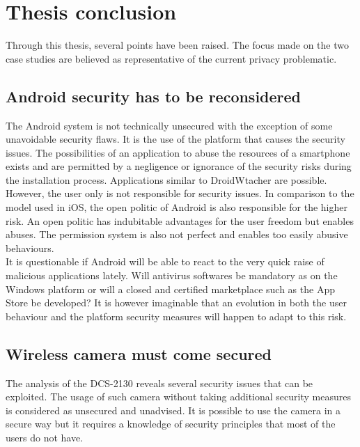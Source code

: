 \chapter{Thesis conclusion}

Through this thesis, several points have been raised.
The focus made on the two case studies are believed as representative of the current privacy problematic.

\section{Android security has to be reconsidered}

The Android system is not technically unsecured with the exception of some unavoidable security flaws.
It is the use of the platform that causes the security issues.
The possibilities of an application to abuse the resources of a smartphone exists and are permitted by a negligence or ignorance of the security risks during the installation process.
Applications similar to DroidWtacher are possible.\\

However, the user only is not responsible for security issues.
In comparison to the model used in iOS, the open politic of Android is also responsible for the higher risk.
An open politic has indubitable advantages for the user freedom but enables abuses.
The permission system is also not perfect and enables too easily abusive behaviours.\\

It is questionable if Android will be able to react to the very quick raise of malicious applications lately.
Will antivirus softwares be mandatory as on the Windows platform or will a closed and certified marketplace such as the App Store be developed?
It is however imaginable that an evolution in both the user behaviour and the platform security measures will happen to adapt to this risk.

\section{Wireless camera must come secured}

The analysis of the DCS-2130 reveals several security issues that can be exploited.
The usage of such camera without taking additional security measures is  considered as unsecured and unadvised.
It is possible to use the camera in a secure way but it requires a knowledge of security principles that most of the users do not have.\\

